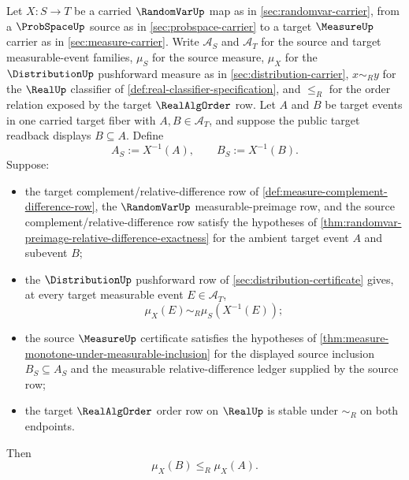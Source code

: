 \begin{theorem}
\label{thm:distribution-pushforward-monotone-events}
Let $X:S\to T$ be a carried $\RandomVarUp$ map as in \autoref{sec:randomvar-carrier}, from a $\ProbSpaceUp$ source as in \autoref{sec:probspace-carrier} to a target $\MeasureUp$ carrier as in \autoref{sec:measure-carrier}. Write $\mathcal{A}_S$ and $\mathcal{A}_T$ for the source and target measurable-event families, $\mu_S$ for the source measure, $\mu_X$ for the $\DistributionUp$ pushforward measure as in \autoref{sec:distribution-carrier}, $x\sim_R y$ for the $\RealUp$ classifier of \autoref{def:real-classifier-specification}, and $\le_R$ for the order relation exposed by the target $\RealAlgOrder$ row. Let $A$ and $B$ be target events in one carried target fiber with $A,B\in\mathcal{A}_T$, and suppose the public target readback displays $B\subseteq A$. Define
$$
A_S:=X^{-1}(A),\qquad B_S:=X^{-1}(B).
$$
Suppose:
\begin{itemize}
\item the target complement/relative-difference row of \autoref{def:measure-complement-difference-row}, the $\RandomVarUp$ measurable-preimage row, and the source complement/relative-difference row satisfy the hypotheses of \autoref{thm:randomvar-preimage-relative-difference-exactness} for the ambient target event $A$ and subevent $B$;
\item the $\DistributionUp$ pushforward row of \autoref{sec:distribution-certificate} gives, at every target measurable event $E\in\mathcal{A}_T$,
$$
\mu_X(E)\sim_R\mu_S(X^{-1}(E));
$$
\item the source $\MeasureUp$ certificate satisfies the hypotheses of \autoref{thm:measure-monotone-under-measurable-inclusion} for the displayed source inclusion $B_S\subseteq A_S$ and the measurable relative-difference ledger supplied by the source row;
\item the target $\RealAlgOrder$ order row on $\RealUp$ is stable under $\sim_R$ on both endpoints.
\end{itemize}
Then
$$
\mu_X(B)\le_R\mu_X(A).
$$
\end{theorem}
